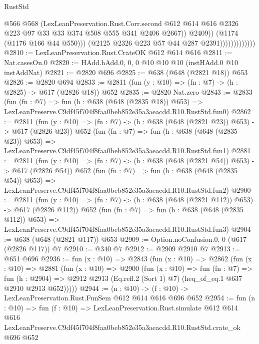\begin{lexlean}{RustStd}
\begin{coremodule}
                                    @566
                                    @568
                                    (LexLeanPreservation.Rust.Corr.second
                                      @612
                                      @614
                                      @616
                                      @2326
                                      @223
                                      @97
                                      @33
                                      @33
                                      @374
                                      @508
                                      @555
                                      @341
                                      @2406
                                      @2667))
                                  @2409))
                              (@1174 (@1176 @166 @44 @550)))
                            (@2125 @2326 @223 @57 @44 @287 @2391)))))))))))))
@2810 := LexLeanPreservation.Rust.CrateOK @612 @614 @616
@2811 := Nat.casesOn.{0}
@2820 := HAdd.hAdd.{0, 0, 0} @10 @10 @10 (instHAdd.{0} @10 instAddNat)
@2821 := @2820 @696
@2825 := @638 (@648 (@2821 @18)) @653
@2826 := @2820 @694
@2833 := @2811 (fun (y : @10) => (fn : @7) -> (h : @2825) -> @617 (@2826 @18)) @652
@2835 := @2820 Nat.zero
@2843 := @2833
    (fun (fn : @7) =>
    fun (h : @638 (@648 (@2835 @18)) @653) =>
    LexLeanPreserve.C9df45f704f8faa0beb852e35a3aeacdd.R10.RustStd.fun0)
@2862 := @2811
    (fun (y : @10) => (fn : @7) -> (h : @638 (@648 (@2821 @23)) @653) -> @617 (@2826 @23))
    @652
    (fun (fn : @7) =>
    fun (h : @638 (@648 (@2835 @23)) @653) =>
    LexLeanPreserve.C9df45f704f8faa0beb852e35a3aeacdd.R10.RustStd.fun1)
@2881 := @2811
    (fun (y : @10) => (fn : @7) -> (h : @638 (@648 (@2821 @54)) @653) -> @617 (@2826 @54))
    @652
    (fun (fn : @7) =>
    fun (h : @638 (@648 (@2835 @54)) @653) =>
    LexLeanPreserve.C9df45f704f8faa0beb852e35a3aeacdd.R10.RustStd.fun2)
@2900 := @2811
    (fun (y : @10) => (fn : @7) -> (h : @638 (@648 (@2821 @112)) @653) -> @617 (@2826 @112))
    @652
    (fun (fn : @7) =>
    fun (h : @638 (@648 (@2835 @112)) @653) =>
    LexLeanPreserve.C9df45f704f8faa0beb852e35a3aeacdd.R10.RustStd.fun3)
@2904 := @638 (@648 (@2821 @117)) @653
@2909 := Option.noConfusion.{0, 0} (@617 (@2826 @117)) @7
@2910 := @340 @7
@2912 := @2909 @2910 @7
@2913 := @651 @696
@2936 := fun (x : @10) =>
  @2843
    (fun (x : @10) =>
    @2862
      (fun (x : @10) =>
      @2881
        (fun (x : @10) =>
        @2900
          (fun (x : @10) =>
          fun (fn : @7) =>
          fun (h : @2904) =>
          @2912 @2913 (Eq.refl.{2} (Sort 1) @7) (heq_of_eq.{1} @637 @2910 @2913 @652)))))
@2944 := (n : @10) -> (f : @10) -> LexLeanPreservation.Rust.FunSem @612 @614 @616 @696 @652
@2954 := fun (n : @10) =>
  fun (f : @10) =>
  LexLeanPreservation.Rust.simulate
    @612
    @614
    @616
    LexLeanPreserve.C9df45f704f8faa0beb852e35a3aeacdd.R10.RustStd.crate_ok
    @696
    @652
\end{coremodule}
\end{lexlean}
